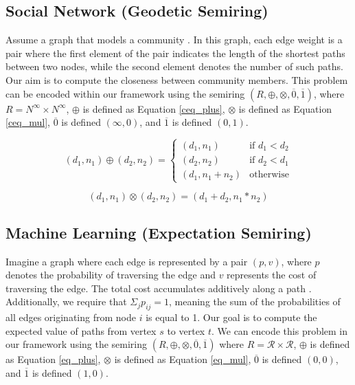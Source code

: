 \documentclass[a4paper,UKenglish,cleveref, autoref, thm-restate, anonymous]{lipics-v2021}
\begin{document}
\subsection{Social Network (Geodetic Semiring)}
Assume a graph that models a community \cite{baras2022path,batagelj1994semirings}. In this graph, each edge weight is a pair where 
the first element of the pair indicates the length of the shortest paths between two nodes, while the second element denotes the number of such paths. Our aim is to compute the closeness between community members.
This problem can be encoded within our framework using the semiring  $(R, \oplus, \otimes, \overline{0}, \overline{1})$, 
where $R = N^{\infty} \times N^{\infty}$, $\oplus$ is defined as Equation \ref{ceq_plus}, 
$\otimes$ is defined as Equation \ref{ceq_mul}, $\overline{0}$ is defined 
$(\infty, 0)$, and $\overline{1}$ is defined $(0, 1)$.


\begin{equation}\label{ceq_plus}
    (d_1, n_1) \oplus (d_2, n_2) =
    \begin{cases}
    (d_1, n_1) & \text{if } d_1 < d_2  \\
    (d_2, n_2) & \text{if } d_2 < d_1  \\
    (d_1, n_1 + n_2) & \text{otherwise}   
  \end{cases}
\end{equation}

\begin{equation}\label{ceq_mul}
    (d_1, n_1) \otimes (d_2, n_2) = (d_1 + d_2, n_1*n_2)
\end{equation}


\subsection{Machine Learning (Expectation Semiring)}
Imagine a graph where each edge is represented by a pair $(p, v)$, where $p$ denotes the probability of traversing the edge and $v$ represents the cost of traversing the edge. The total cost accumulates additively along a path \cite{baras2022path,10.3115/1073083.1073085,10.1007/11682462_32}. Additionally, we require that $\Sigma_j p_{ij} = 1$, meaning the sum of the probabilities of all edges originating from node $i$ is equal to 1. Our goal is to compute the expected value of paths from vertex $s$ to vertex $t$. We can encode this problem in our framework 
using the semiring $(R, \oplus, \otimes, \overline{0}, \overline{1})$ where 
$R = \mathcal{R} \times \mathcal{R}$, $\oplus$ is defined as Equation \ref{eq_plus}, 
$\otimes$ is defined as Equation \ref{eq_mul}, $\overline{0}$ is defined 
$(0, 0)$, and $\overline{1}$ is defined $(1, 0)$.
\end{document}
